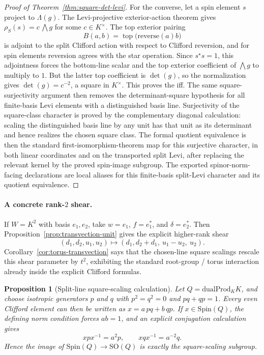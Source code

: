 \documentclass{birkjour}
\theoremstyle{plain}
\newtheorem{proposition}[theorem]{Proposition}
\theoremstyle{definition}
\theoremstyle{remark}
\newcommand{\Spin}{\mathrm{Spin}}
\newcommand{\SO}{\mathrm{SO}}
\newcommand{\dualProd}{\mathrm{dualProd}}
\begin{document}
\begin{proof}[Proof of Theorem~\ref{thm:square-det-levi}]
For the converse, let a spin element \(s\) project to \(\Lambda(g)\). The
Levi-projective exterior-action theorem gives
\(\rho_S(s)=c\,\bigwedge g\) for some \(c\in K^\times\). The top exterior
pairing
\[
  B(a,b)=\operatorname{top}\bigl(\mathrm{reverse}(a)b\bigr)
\]
is adjoint to the split Clifford action with respect to Clifford reversion, and
for spin elements reversion agrees with the star operation. Since \(s^\star s=1\),
this adjointness forces the bottom-line scalar and the top exterior coefficient
of \(\bigwedge g\) to multiply to \(1\). But the latter top coefficient is
\(\det(g)\), so the normalization gives \(\det(g)=c^{-2}\), a square in
\(K^\times\). This proves the iff. The same square-surjectivity argument then
removes the determinant-square hypothesis for all finite-basis Levi elements
with a distinguished basis line. Surjectivity of the square-class character is
proved by the complementary diagonal calculation: scaling the distinguished
basis line by any unit has that unit as its determinant and hence realizes the
chosen square class. The formal quotient equivalence is then the standard
first-isomorphism-theorem map for this surjective character, in both linear coordinates and on
the transported split Levi, after replacing the relevant kernel by the proved spin-image subgroup.
The exported spinor-norm-facing declarations are local aliases for this
finite-basis split-Levi character and its quotient equivalence.
\end{proof}

\paragraph{A concrete rank-$2$ shear.}
If $W=K^2$ with basis $e_1,e_2$, take $w=e_1$, $f=e_1^*$, and
$\delta=e_2^*$. Then Proposition~\ref{prop:transvection-unit} gives the
explicit higher-rank shear
\[
  (d_1,d_2,u_1,u_2)\longmapsto (d_1,d_2+d_1,\ u_1-u_2,\ u_2).
\]
Corollary~\ref{cor:torus-transvection} says that the chosen-line square
scalings rescale this shear parameter by $t^2$, exhibiting the standard
root-group / torus interaction already inside the explicit Clifford formulas.

\begin{proposition}[Split-line square-scaling calculation]
\label{prop:split-line-square}
Let $Q=\dualProd_K K$, and choose isotropic generators $p$ and $q$ with
\(p^2=q^2=0\) and \(pq+qp=1\). Every even Clifford element can then be written
as \(x=a\,pq+b\,qp\). If \(x\in \Spin(Q)\), the defining norm condition forces
\(ab=1\), and an explicit conjugation calculation gives
\[
  x p x^{-1}=a^2 p,
  \qquad
  x q x^{-1}=a^{-2} q.
\]
Hence the image of $\Spin(Q)\to \SO(Q)$ is exactly the square-scaling subgroup.
\end{proposition}
\end{document}
